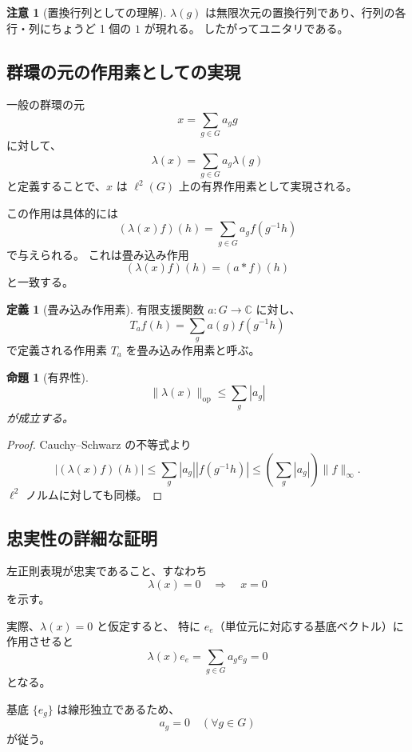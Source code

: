 \documentclass[12pt,a4paper]{ltjarticle}
\newtheorem*{proposition}{命題}
\theoremstyle{definition}
\newtheorem*{definition}{定義}
\newtheorem*{remark}{注意}
\begin{document}
\begin{remark}[置換行列としての理解]
$\lambda(g)$ は無限次元の置換行列であり、行列の各行・列にちょうど 1 個の $1$ が現れる。
したがってユニタリである。
\end{remark}

\subsection{群環の元の作用素としての実現}

一般の群環の元
\[
x = \sum_{g \in G} a_g g
\]
に対して、
\[
\lambda(x) = \sum_{g \in G} a_g \lambda(g)
\]
と定義することで、$x$ は $\ell^2(G)$ 上の有界作用素として実現される。

この作用は具体的には
\[
(\lambda(x)f)(h) = \sum_{g \in G} a_g f(g^{-1}h)
\]
で与えられる。
これは畳み込み作用
\[
(\lambda(x)f)(h) = (a * f)(h)
\]
と一致する。

\begin{definition}[畳み込み作用素]
有限支援関数 $a:G\to\mathbb{C}$ に対し、
\[
T_a f(h)=\sum_{g}a(g)f(g^{-1}h)
\]
で定義される作用素 $T_a$ を畳み込み作用素と呼ぶ。
\end{definition}

\begin{proposition}[有界性]
\[
\|\lambda(x)\|_{\mathrm{op}}\le \sum_{g}|a_g|
\]
が成立する。
\end{proposition}

\begin{proof}
Cauchy–Schwarz の不等式より
\[
|(\lambda(x)f)(h)|\le \sum_{g}|a_g||f(g^{-1}h)|
\le \left(\sum_{g}|a_g|\right)\|f\|_\infty.
\]
$\ell^2$ ノルムに対しても同様。
\end{proof}

\subsection{忠実性の詳細な証明}

左正則表現が忠実であること、すなわち
\[
\lambda(x) = 0 \quad \Rightarrow \quad x = 0
\]
を示す。

実際、$\lambda(x) = 0$ と仮定すると、
特に $e_e$（単位元に対応する基底ベクトル）に作用させると
\[
\lambda(x)e_e = \sum_{g \in G} a_g e_g = 0
\]
となる。

基底 $\{e_g\}$ は線形独立であるため、
\[
a_g = 0 \quad (\forall g \in G)
\]
が従う。
\end{document}
